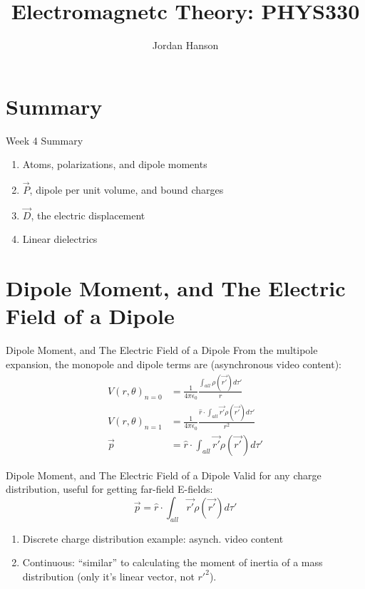 \documentclass{beamer}
\title{Electromagnetc Theory: PHYS330}
\author{Jordan Hanson}
\institute{Whittier College Department of Physics and Astronomy}
\begin{document}
\maketitle

\section{Summary}

\begin{frame}{Week 4 Summary}
\begin{enumerate}
\item Atoms, polarizations, and dipole moments
\item $\vec{P}$, dipole per unit volume, and bound charges
\item $\vec{D}$, the electric displacement
\item Linear dielectrics
\end{enumerate}
\end{frame}

\section{Dipole Moment, and The Electric Field of a Dipole}

\begin{frame}{Dipole Moment, and The Electric Field of a Dipole}
From the multipole expansion, the monopole and dipole terms are (asynchronous video content):
\begin{align}
V(r,\theta)_{n=0} &= \frac{1}{4\pi\epsilon_0}\frac{\int_{all} \rho(\vec{r'})d\tau'}{r} \\
V(r,\theta)_{n=1} &= \frac{1}{4\pi\epsilon_0}\frac{\hat{r} \cdot \int_{all} \vec{r'} \rho(\vec{r'})d\tau'}{r^2} \\
\vec{p} &= \hat{r} \cdot \int_{all} \vec{r'} \rho(\vec{r'})d\tau'
\end{align}
\end{frame}

\begin{frame}{Dipole Moment, and The Electric Field of a Dipole}
Valid for any charge distribution, useful for getting far-field E-fields:
\begin{equation}
\boxed{
\vec{p} = \hat{r} \cdot \int_{all} \vec{r'} \rho(\vec{r'})d\tau'
}
\end{equation}
\begin{enumerate}
\item Discrete charge distribution example: asynch. video content
\item Continuous: ``similar'' to calculating the moment of inertia of a mass distribution (only it's linear vector, not $r'^2$).
\end{enumerate}
\end{frame}
\end{document}
